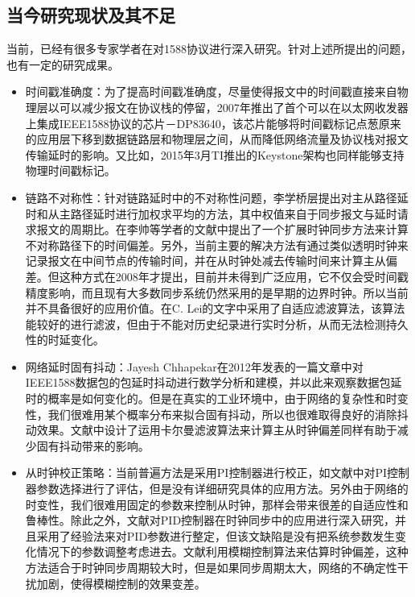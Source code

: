 \subsection{当今研究现状及其不足}
\label{sec:1588_problem_research}
当前，已经有很多专家学者在对1588协议进行深入研究。针对上述所提出的问题，也有一定的研究成果。
\begin{itemize}[noitemsep,topsep=0pt,parsep=0pt,partopsep=0pt]
	\item 时间戳准确度：为了提高时间戳准确度，尽量使得报文中的时间戳直接来自物理层以可以减少报文在协议栈的停留，2007年推出了首个可以在以太网收发器上集成IEEE1588协议的芯片－DP83640\supercite{4}，该芯片能够将时间戳标记点葱原来的应用层下移到数据链路层和物理层之间，从而降低网络流量及协议栈对报文传输延时的影响。又比如，2015年3月TI推出的Keystone架构也同样能够支持物理时间戳标记\supercite{5}。
	\item 链路不对称性：针对链路延时中的不对称性问题，李学桥层提出对主从路径延时和从主路径延时进行加权求平均的方法，其中权值来自于同步报文与延时请求报文的周期比\supercite{6}。在李帅等学者的文献\parencite{7}中提出了一个扩展时钟同步方法来计算不对称路径下的时间偏差。另外，当前主要的解决方法有通过类似透明时钟来记录报文在中间节点的传输时间，并在从时钟处减去传输时间来计算主从偏差。但这种方式在2008年才提出，目前并未得到广泛应用，它不仅会受时间戳精度影响，而且现有大多数同步系统仍然采用的是早期的边界时钟。所以当前并不具备很好的应用价值。在C. Lei的文字\supercite{57}中采用了自适应滤波算法，该算法能较好的进行滤波，但由于不能对历史纪录进行实时分析，从而无法检测持久性的时延变化。
	\item 网络延时固有抖动：Jayesh Chhapekar在2012年发表的一篇文章中对IEEE1588数据包的包延时抖动进行数学分析和建模，并以此来观察数据包延时的概率是如何变化的\supercite{8}。但是在真实的工业环境中，由于网络的复杂性和时变性，我们很难用某个概率分布来拟合固有抖动，所以也很难取得良好的消除抖动效果。文献\parencite{9}中设计了运用卡尔曼滤波算法来计算主从时钟偏差同样有助于减少固有抖动带来的影响。
	\item 从时钟校正策略：当前普遍方法是采用PI控制器进行校正，如文献\parencite{10}中对PI控制器参数选择进行了评估，但是没有详细研究具体的应用方法。另外由于网络的时变性，我们很难用固定的参数来控制从时钟，那样会带来很差的自适应性和鲁棒性。除此之外，文献\parencite{11}对PID控制器在时钟同步中的应用进行深入研究，并且采用了经验法来对PID参数进行整定，但该文缺陷是没有把系统参数发生变化情况下的参数调整考虑进去。文献\parencite{12}利用模糊控制算法来估算时钟偏差，这种方法适合于时钟同步周期较大时，但是如果同步周期太大，网络的不确定性干扰加剧，使得模糊控制的效果变差。
\end{itemize}

